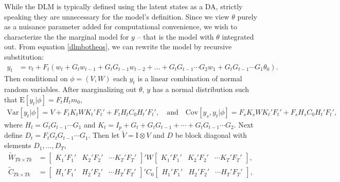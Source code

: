 \documentclass[12pt]{article}
\begin{document}
While the DLM is typically defined using the latent states as a DA, strictly speaking they are unnecessary for the model's definition. Since we view $\theta$ purely as a nuisance parameter added for computational convenience, we wish to characterize the the marginal model for $y$ -- that is the model with $\theta$ integrated out. From equation \eqref{dlmbotheqs}, we can rewrite the model by recursive substitution:
\begin{align*}
  y_t &= v_t + F_t\left(w_t + G_tw_{t-1} + G_tG_{t-1}w_{t-2} + ... + G_tG_{t-1}\cdots G_{2}w_1 + G_tG_{t-1}\cdots G_1\theta_0\right).
\end{align*}
Then conditional on $\phi=(V,W)$ each $y_t$ is a linear combination of normal random variables. After marginalizing out $\theta$, $y$ has a normal distribution such that $\mathrm{E}[y_t|\phi] =  F_tH_tm_0$,
\begin{align*}
  \mathrm{Var}[y_t|\phi] =  V + F_tK_tWK_t'F_t' + F_tH_tC_0H_t'F_t',\quad \mathrm{and} \quad
  \mathrm{Cov}[y_s,y_t|\phi] = F_sK_sWK_t'F_t' + F_sH_sC_0H_t'F_t',
\end{align*}
where $H_t = G_tG_{t-1}\cdots G_1$ and $K_t = I_p + G_t + G_tG_{t-1} + \cdots + G_tG_{t-1}\cdots G_2$. Next define $D_t = F_tG_tG_{t-1}\cdots G_1$. Then let $\tilde{V}=\mathrm{I}\otimes V$ and $D$ be block diagonal with elements $D_1,\ldots,D_T$, 
\begin{align*}
\tilde{W}_{Tk\times Tk} &= \begin{bmatrix} K_1'F_1' & K_2'F_2' & \cdots K_T'F_T' \end{bmatrix}' W \begin{bmatrix} K_1'F_1' & K_2'F_2' & \cdots K_T'F_T' \end{bmatrix}, &\\
\tilde{C}_{Tk\times Tk} &= \begin{bmatrix} H_1'F_1' & H_2'F_2' & \cdots H_T'F_T' \end{bmatrix}' C_0 \begin{bmatrix} H_1'F_1' & H_2'F_2' & \cdots H_T'F_T' \end{bmatrix},&
\end{align*}
\end{document}
